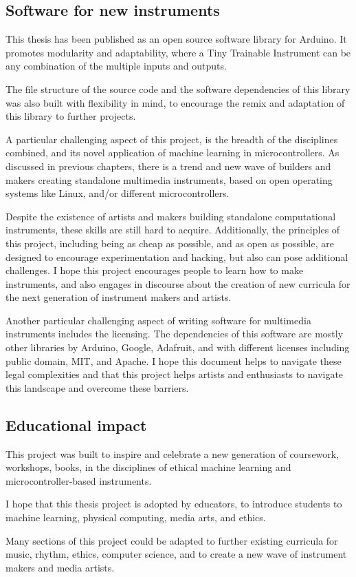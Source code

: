 \subsection{Software for new instruments}

This thesis has been published as an open source software library for Arduino. It promotes modularity and adaptability, where a Tiny Trainable Instrument can be any combination of the multiple inputs and outputs.

The file structure of the source code and the software dependencies of this library was also built with flexibility in mind, to encourage the remix and adaptation of this library to further projects.

A particular challenging aspect of this project, is the breadth of the disciplines combined, and its novel application of machine learning in microcontrollers. As discussed in previous chapters, there is a trend and new wave of builders and makers creating standalone multimedia instruments, based on open operating systems like Linux, and/or different microcontrollers. 

Despite the existence of artists and makers building standalone computational instruments, these skills are still hard to acquire. Additionally, the principles of this project, including being as cheap as possible, and as open as possible, are designed to encourage experimentation and hacking, but also can pose additional challenges. I hope this project encourages people to learn how to make instruments, and also engages in discourse about the creation of new curricula for the next generation of instrument makers and artists.

Another particular challenging aspect of writing software for multimedia instruments includes the licensing. The dependencies of this software are mostly other libraries by Arduino, Google, Adafruit, and with different licenses including public domain, MIT, and Apache. I hope this document helps to navigate these legal complexities and that this project helps artists and enthusiasts to navigate this landscape and overcome these barriers.

\subsection{Educational impact}

This project was built to inspire and celebrate a new generation of coursework, workshops, books, in the disciplines of ethical machine learning and microcontroller-based instruments.

I hope that this thesis project is adopted by educators, to introduce students to machine learning, physical computing, media arts, and ethics.

Many sections of this project could be adapted to further existing curricula for music, rhythm, ethics, computer science, and to create a new wave of instrument makers and media artists.

